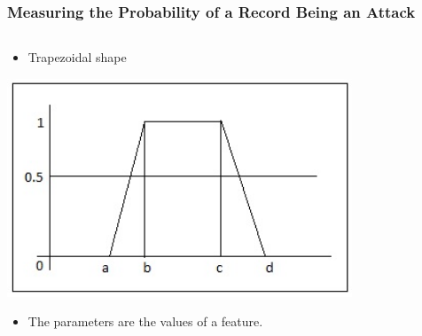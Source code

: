 \documentclass{beamer}
\begin{document}
\begin{frame}
  \frametitle{Measuring the Probability of a Record Being an Attack}

  \begin{columns}
  \begin{column}{0.4\textwidth}
  \begin{itemize}
  	\item Trapezoidal shape
  \end{itemize}
  
  \includegraphics[width=0.95\textwidth]{../trapFigure.jpg}
  
  \begin{itemize}
	\item The parameters are the values of a feature.
  \end{itemize}  
  
  \end{column}


  \begin{column}{0.6\textwidth}
  
\begin{algorithmic}
\ELSE {}
\ENDIF
\end{algorithmic}

  \end{column}
  \end{columns}
\end{frame}
\end{document}
